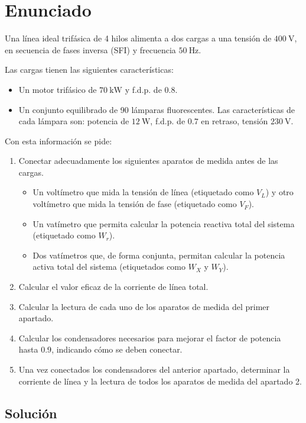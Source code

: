 \section{Enunciado}

Una línea ideal trifásica de 4 hilos alimenta a dos cargas a una
tensión de $\SI{400}{\volt}$, en secuencia de fases inversa (SFI) y
frecuencia $\SI{50}{\hertz}$.

\vspace{3mm}
Las cargas tienen las siguientes características:
\begin{itemize}
\item Un motor trifásico de $\SI{70}{\kilo\watt}$ y f.d.p. de $0.8$.
\item Un conjunto equilibrado de 90 lámparas fluorescentes. Las
  características de cada lámpara son: potencia de $\SI{12}{\watt}$,
  f.d.p. de $0.7$ en retraso, tensión $\SI{230}{\volt}$.
\end{itemize}

Con esta información se pide:
\begin{enumerate}
\item Conectar adecuadamente los siguientes aparatos de medida antes
  de las cargas.
  \begin{itemize}
  \item Un voltímetro que mida la tensión de línea (etiquetado como
    $V_L$) y otro voltímetro que mida la tensión de fase (etiquetado
    como $V_F$).
  \item Un vatímetro que permita calcular la potencia reactiva total
    del sistema (etiquetado como $W_r$).
  \item Dos vatímetros que, de forma conjunta, permitan calcular la
    potencia activa total del sistema (etiquetados como $W_X$ y
    $W_Y$).
  \end{itemize}
\item Calcular el valor eficaz de la corriente de línea
  total.
\item Calcular la lectura de cada uno de los aparatos
  de medida del primer apartado.
\item Calcular los condensadores necesarios para
  mejorar el factor de potencia hasta $0.9$, indicando cómo se deben
  conectar.
\item Una vez conectados los condensadores del anterior
  apartado, determinar la corriente de línea y la lectura de todos los
  aparatos de medida del apartado 2.
\end{enumerate}

\subsection*{Solución}

